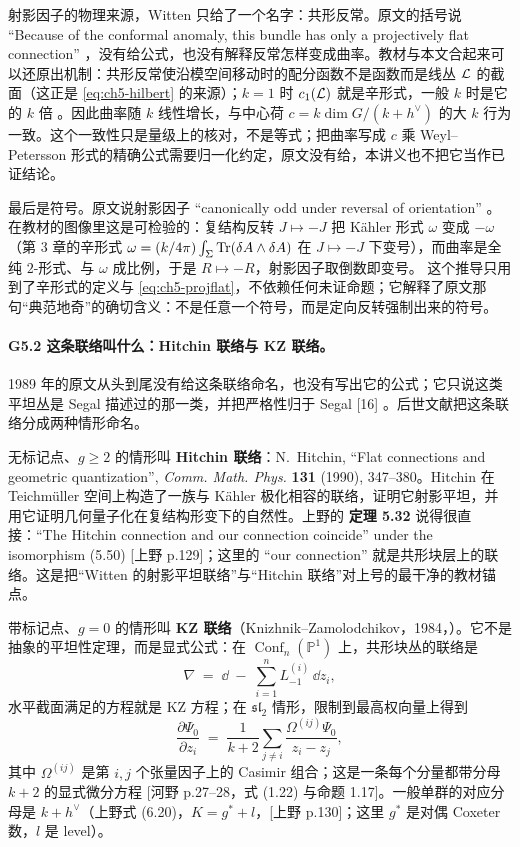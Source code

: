 射影因子的物理来源，Witten 只给了一个名字：共形反常。原文的括号说 “Because of the conformal anomaly, this bundle has only a projectively flat connection” ，没有给公式，也没有解释反常怎样变成曲率。教材与本文合起来可以还原出机制：共形反常使沿模空间移动时的配分函数不是函数而是线丛 $\mathcal{L}$ 的截面（这正是 \eqref{eq:ch5-hilbert} 的来源）；$k=1$ 时 $c_1(\mathcal{L})$ 就是辛形式，一般 $k$ 时是它的 $k$ 倍 。因此曲率随 $k$ 线性增长，与中心荷 $c=k\dim G/(k+h^\vee)$ 的大 $k$ 行为一致。这个一致性只是量级上的核对，不是等式；把曲率写成 $c$ 乘 Weyl--Petersson 形式的精确公式需要归一化约定，原文没有给，本讲义也不把它当作已证结论。

最后是符号。原文说射影因子 “canonically odd under reversal of orientation” 。在教材的图像里这是可检验的：复结构反转 $J\mapsto-J$ 把 Kähler 形式 $\omega$ 变成 $-\omega$（第 3 章的辛形式 $\omega=(k/4\pi)\int_\Sigma\operatorname{Tr}(\delta A\wedge\delta A)$ 在 $J\mapsto-J$ 下变号），而曲率是全纯 $2$-形式、与 $\omega$ 成比例，于是 $R\mapsto-R$，射影因子取倒数即变号。\ours{} 这个推导只用到了辛形式的定义与 \eqref{eq:ch5-projflat}，不依赖任何未证命题；它解释了原文那句“典范地奇”的确切含义：不是任意一个符号，而是定向反转强制出来的符号。

\paragraph{G5.2 这条联络叫什么：Hitchin 联络与 KZ 联络。}1989 年的原文从头到尾没有给这条联络命名，也没有写出它的公式；它只说这类平坦丛是 Segal 描述过的那一类，并把严格性归于 Segal [16] 。后世文献把这条联络分成两种情形命名。

无标记点、$g\ge2$ 的情形叫 \textbf{Hitchin 联络}：N.~Hitchin, “Flat connections and geometric quantization”, \emph{Comm. Math. Phys.} \textbf{131} (1990), 347--380。Hitchin 在 Teichmüller 空间上构造了一族与 Kähler 极化相容的联络，证明它射影平坦，并用它证明几何量子化在复结构形变下的自然性。上野的 \textbf{定理 5.32} 说得很直接：“The Hitchin connection and our connection coincide” under the isomorphism (5.50) [上野 p.129]；这里的 “our connection” 就是共形块层上的联络。这是把“Witten 的射影平坦联络”与“Hitchin 联络”对上号的最干净的教材锚点。

带标记点、$g=0$ 的情形叫 \textbf{KZ 联络}（Knizhnik--Zamolodchikov，1984，\cite{knizhnik1984}）。它不是抽象的平坦性定理，而是显式公式：在 $\operatorname{Conf}_n(\mathbb P^1)$ 上，共形块丛的联络是
\begin{equation}
\nabla \;=\; \dd \;-\; \sum_{i=1}^{n} L^{(i)}_{-1}\,\dd z_i ,
\label{eq:ch5-kzconn}
\end{equation}
水平截面满足的方程就是 KZ 方程；在 $\mathfrak{sl}_2$ 情形，限制到最高权向量上得到
\begin{equation}
\frac{\partial\Psi_0}{\partial z_i}
\;=\; \frac{1}{k+2}\sum_{j\neq i}\frac{\Omega^{(ij)}\Psi_0}{z_i-z_j},
\label{eq:ch5-kz}
\end{equation}
其中 $\Omega^{(ij)}$ 是第 $i,j$ 个张量因子上的 Casimir 组合；这是一条每个分量都带分母 $k+2$ 的显式微分方程 [河野 p.27--28，式 (1.22) 与命题 1.17]。一般单群的对应分母是 $k+h^\vee$（上野式 (6.20)，$K=g^*+l$，[上野 p.130]；这里 $g^*$ 是对偶 Coxeter 数，$l$ 是 level）。

